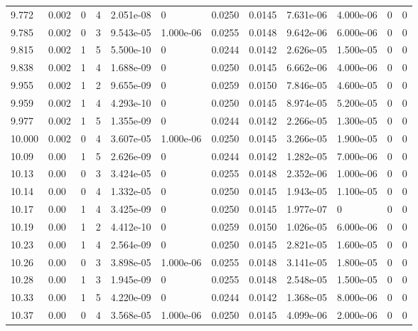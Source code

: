 \documentclass[preview]{standalone}
\begin{document}
{{{{{{{\begin{tabular}{L{1.2cm}C{1.2cm} C{0.3cm}C{0.5cm} C{1.4cm}C{1.4cm} C{1.4cm}C{1.4cm} C{1.6cm}C{1.6cm} C{1.6cm}C{1.6cm}}
  9.772  &  0.002  & 0     &  4 &  2.051e-08  & 0  &  0.0250&   0.0145& 7.631e-06 & 4.000e-06   &  0 & 0  \\ 
  9.785  &  0.002  & 0     &  3 &  9.543e-05  & 1.000e-06  &  0.0255&   0.0148& 9.642e-06 & 6.000e-06   &  0 & 0  \\ 
  9.815  &  0.002  & 1     &  5 &  5.500e-10  & 0  &  0.0244&   0.0142& 2.626e-05 & 1.500e-05   &  0 & 0  \\ 
  9.838  &  0.002  & 1     &  4 &  1.688e-09  & 0  &  0.0250&   0.0145& 6.662e-06 & 4.000e-06   &  0 & 0  \\ 
  9.955  &  0.002  & 1     &  2 &  9.655e-09  & 0  &  0.0259&   0.0150& 7.846e-05 & 4.600e-05   &  0 & 0  \\ 
  9.959  &  0.002  & 1     &  4 &  4.293e-10  & 0  &  0.0250&   0.0145& 8.974e-05 & 5.200e-05   &  0 & 0  \\ 
  9.977  &  0.002  & 1     &  5 &  1.355e-09  & 0  &  0.0244&   0.0142& 2.266e-05 & 1.300e-05   &  0 & 0  \\ 
  10.000  &  0.002  & 0     &  4 &  3.607e-05  & 1.000e-06  &  0.0250&   0.0145& 3.266e-05 & 1.900e-05   &  0 & 0  \\ 
  10.09  &  0.00  & 1     &  5 &  2.626e-09  & 0  &  0.0244&   0.0142& 1.282e-05 & 7.000e-06   &  0 & 0  \\ 
  10.13  &  0.00  & 0     &  3 &  3.424e-05  & 0  &  0.0255&   0.0148& 2.352e-06 & 1.000e-06   &  0 & 0  \\ 
  10.14  &  0.00  & 0     &  4 &  1.332e-05  & 0  &  0.0250&   0.0145& 1.943e-05 & 1.100e-05   &  0 & 0  \\ 
  10.17  &  0.00  & 1     &  4 &  3.425e-09  & 0  &  0.0250&   0.0145& 1.977e-07 & 0   &  0 & 0  \\ 
  10.19  &  0.00  & 1     &  2 &  4.412e-10  & 0  &  0.0259&   0.0150& 1.026e-05 & 6.000e-06   &  0 & 0  \\ 
  10.23  &  0.00  & 1     &  4 &  2.564e-09  & 0  &  0.0250&   0.0145& 2.821e-05 & 1.600e-05   &  0 & 0  \\ 
  10.26  &  0.00  & 0     &  3 &  3.898e-05  & 1.000e-06  &  0.0255&   0.0148& 3.141e-05 & 1.800e-05   &  0 & 0  \\ 
  10.28  &  0.00  & 1     &  3 &  1.945e-09  & 0  &  0.0255&   0.0148& 2.548e-05 & 1.500e-05   &  0 & 0  \\ 
  10.33  &  0.00  & 1     &  5 &  4.220e-09  & 0  &  0.0244&   0.0142& 1.368e-05 & 8.000e-06   &  0 & 0  \\ 
  10.37  &  0.00  & 0     &  4 &  3.568e-05  & 1.000e-06  &  0.0250&   0.0145& 4.099e-06 & 2.000e-06   &  0 & 0  \\ 

\end{tabular}}}}}}}}
\end{document}
